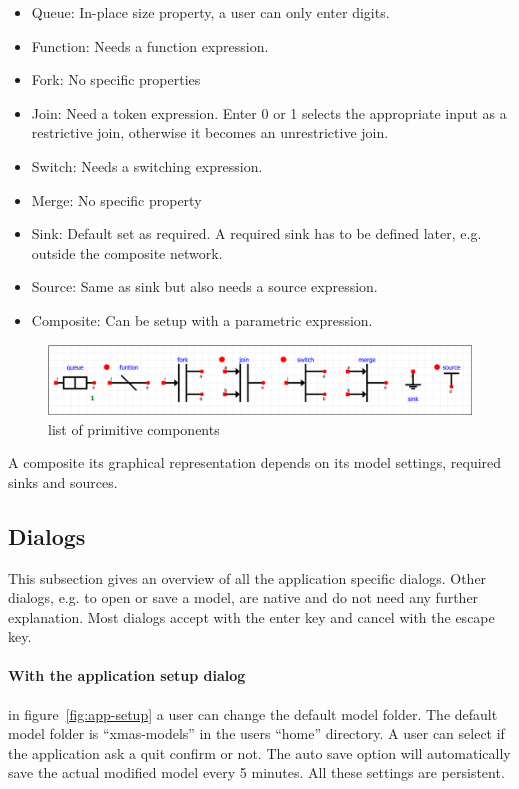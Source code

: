 \begin{itemize}
\item Queue: In-place size property, a user can only enter digits.
\item Function: Needs a function expression.
\item Fork: No specific properties
\item Join: Need a token expression. Enter 0 or 1 selects the appropriate
input as a restrictive join, otherwise it becomes an unrestrictive join.
\item Switch: Needs a switching expression.
\item Merge: No specific property
\item Sink: Default set as required. A required sink has to be defined later, e.g. outside the composite network.
\item Source: Same as sink but also needs a source expression.
\item Composite: Can be setup with a parametric expression.
\end{itemize}

\begin{figure}[here]
\begin{center}	
	\includegraphics[width=.70\linewidth]{pictures/primitives}
	\caption{list of primitive components}
	\label{fig:primitives}
\end{center}
\end{figure}

A composite its graphical representation depends on its model settings,
required sinks and sources.

\subsection{Dialogs}
This subsection gives an overview of all the application specific dialogs. Other
dialogs, e.g. to open or save a model, are native and do not need any further
explanation.
Most dialogs accept with the enter key and cancel with the escape key.

\paragraph{With the application setup dialog} in figure~\ref{fig:app-setup} a
user can change the default model folder. The default model folder is
``xmas-models'' in the users ``home'' directory. A user can select if the
application ask a quit confirm or not. The auto save option will automatically
save the actual modified model every 5 minutes. All these settings are
persistent.\\

